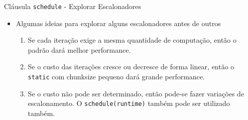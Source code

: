 	\begin{frame}{Cláusula {\tt schedule} - Explorar Escalonadores}
		\begin{itemize}
			\item Algumas ideias para explorar alguns escalonadores antes de outros
			\begin{enumerate}
				\item Se cada iteração exige a mesma quantidade de computação, então o padrão dará melhor performance.
				\item Se o custo das iterações cresce ou decresce de forma linear, então o {\tt static} com chunksize pequeno dará grande performance.
				\item Se o custo não pode ser determinado, então pode-se fazer variações de escalonamento. O {\tt schedule(runtime)} também pode ser utilizado também.
			\end{enumerate}
		\end{itemize}
	\end{frame}










